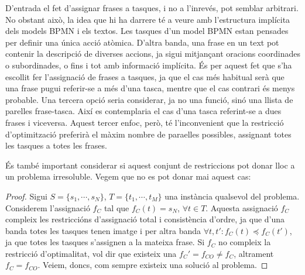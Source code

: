 D'entrada el fet d'assignar frases a tasques, i no a l'inrevés, pot semblar arbitrari. No obstant això, la idea que hi ha darrere té a veure amb l'estructura implícita dels models BPMN i els textos. Les tasques d'un model BPMN estan pensades per definir una única acció atòmica. D'altra banda, una frase en un text pot contenir la descripció de diverses accions, ja sigui mitjançant oracions coordinades o subordinades, o fins i tot amb informació implícita. És per aquest fet que s'ha escollit fer l'assignació de frases a tasques, ja que el cas més habitual serà que una frase pugui referir-se a més d'una tasca, mentre que el cas contrari és menys probable. Una tercera opció seria considerar, ja no una funció, sinó una llista de parelles frase-tasca. Així es contemplaria el cas d'una tasca referint-se a dues frases i viceversa. Aquest tercer enfoc, però, té l'inconvenient que la restricció d'optimització preferirà el màxim nombre de paraelles possibles, assignant totes les tasques a totes les frases.

És també important considerar si aquest conjunt de restriccions pot donar lloc a un problema irresoluble. Vegem que no es pot donar mai aquest cas:

\begin{proof}
Sigui $S = \{s_1, \cdots, s_N\}$, $T = \{t_1, \cdots, t_M\}$ una instància qualsevol del problema. Considerem l'assignació $f_C$ tal que $f_C(t) = s_N$, $\forall t \in T$. Aquesta assignació $f_C$ compleix les restriccións d'assignació total i consistència d'ordre, ja que d'una banda totes les tasques tenen imatge i  per altra banda $\forall t, t': f_C(t) \preceq f_C(t')$, ja que totes les tasques s'assignen a la mateixa frase. Si $f_C$ no compleix la restricció d'optimalitat, vol dir que existeix una $f_C' = f_{CO} \neq f_C$, altrament $f_C = f_{CO}$. Veiem, doncs, com sempre existeix una solució al problema. 
\end{proof}

